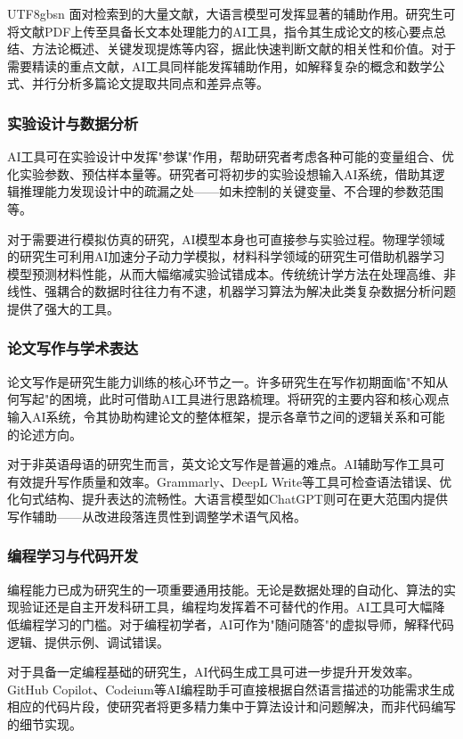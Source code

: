 \documentclass[12pt,a4paper]{article}
\begin{document}
\begin{CJK}{UTF8}{gbsn}
面对检索到的大量文献，大语言模型可发挥显著的辅助作用。研究生可将文献PDF上传至具备长文本处理能力的AI工具，指令其生成论文的核心要点总结、方法论概述、关键发现提炼等内容，据此快速判断文献的相关性和价值。对于需要精读的重点文献，AI工具同样能发挥辅助作用，如解释复杂的概念和数学公式、并行分析多篇论文提取共同点和差异点等。

\subsubsection{实验设计与数据分析}

AI工具可在实验设计中发挥"参谋"作用，帮助研究者考虑各种可能的变量组合、优化实验参数、预估样本量等。研究者可将初步的实验设想输入AI系统，借助其逻辑推理能力发现设计中的疏漏之处——如未控制的关键变量、不合理的参数范围等。

对于需要进行模拟仿真的研究，AI模型本身也可直接参与实验过程。物理学领域的研究生可利用AI加速分子动力学模拟，材料科学领域的研究生可借助机器学习模型预测材料性能，从而大幅缩减实验试错成本。传统统计学方法在处理高维、非线性、强耦合的数据时往往力有不逮，机器学习算法为解决此类复杂数据分析问题提供了强大的工具。

\subsubsection{论文写作与学术表达}

论文写作是研究生能力训练的核心环节之一。许多研究生在写作初期面临"不知从何写起"的困境，此时可借助AI工具进行思路梳理。将研究的主要内容和核心观点输入AI系统，令其协助构建论文的整体框架，提示各章节之间的逻辑关系和可能的论述方向。

对于非英语母语的研究生而言，英文论文写作是普遍的难点。AI辅助写作工具可有效提升写作质量和效率。Grammarly、DeepL Write等工具可检查语法错误、优化句式结构、提升表达的流畅性。大语言模型如ChatGPT则可在更大范围内提供写作辅助——从改进段落连贯性到调整学术语气风格。

\subsubsection{编程学习与代码开发}

编程能力已成为研究生的一项重要通用技能。无论是数据处理的自动化、算法的实现验证还是自主开发科研工具，编程均发挥着不可替代的作用。AI工具可大幅降低编程学习的门槛。对于编程初学者，AI可作为"随问随答"的虚拟导师，解释代码逻辑、提供示例、调试错误。

对于具备一定编程基础的研究生，AI代码生成工具可进一步提升开发效率。GitHub Copilot、Codeium等AI编程助手可直接根据自然语言描述的功能需求生成相应的代码片段，使研究者将更多精力集中于算法设计和问题解决，而非代码编写的细节实现。


\end{CJK}
\end{document}
